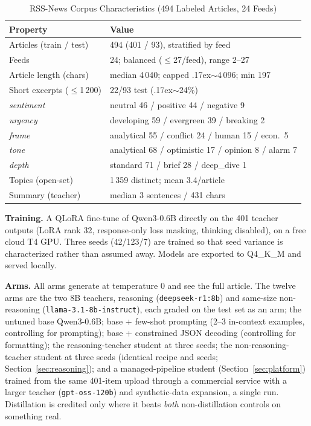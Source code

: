 \documentclass[10pt,journal]{IEEEtran}
\begin{document}
\begin{table}[t]
\centering
\caption{RSS-News Corpus Characteristics (494 Labeled Articles, 24 Feeds)}
\label{tab:corpus}
\small
\setlength{\tabcolsep}{3pt}\begin{tabular}{@{}l p{5.2cm}@{}}
\toprule
Property & Value \\
\midrule
Articles (train / test) & 494 (401 / 93), stratified by feed \\
Feeds & 24; balanced ($\leq$27/feed), range 2--27 \\
Article length (chars) & median 4\,040; capped {\raise.17ex\hbox{$\scriptstyle\sim$}}4\,096; min 197 \\
Short excerpts ($\leq$1\,200) & 22/93 test ({\raise.17ex\hbox{$\scriptstyle\sim$}}24\%) \\
\emph{sentiment} & neutral 46 / positive 44 / negative 9 \\
\emph{urgency} & developing 59 / evergreen 39 / breaking 2 \\
\emph{frame} & analytical 55 / conflict 24 / human 15 / econ.\ 5 \\
\emph{tone} & analytical 68 / optimistic 17 / opinion 8 / alarm 7 \\
\emph{depth} & standard 71 / brief 28 / deep\_dive 1 \\
Topics (open-set) & 1\,359 distinct; mean 3.4/article \\
Summary (teacher) & median 3 sentences / 431 chars \\
\bottomrule
\end{tabular}
\end{table}

\textbf{Training.} A QLoRA fine-tune of Qwen3-0.6B directly on the 401 teacher outputs (LoRA rank 32, response-only loss masking, thinking disabled), on a free cloud T4 GPU. Three seeds (42/123/7) are trained so that seed variance is characterized rather than assumed away. Models are exported to Q4\_K\_M and served locally.

\textbf{Arms.} All arms generate at temperature 0 and see the full article. The twelve arms are the two 8B teachers, reasoning (\texttt{deepseek-r1:8b}) and same-size non-reasoning (\texttt{llama-3.1-8b-instruct}), each graded on the test set as an arm; the untuned base Qwen3-0.6B; base + few-shot prompting (2--3 in-context examples, controlling for prompting); base + constrained JSON decoding (controlling for formatting); the reasoning-teacher student at three seeds; the non-reasoning-teacher student at three seeds (identical recipe and seeds; Section~\ref{sec:reasoning}); and a managed-pipeline student (Section~\ref{sec:platform}) trained from the same 401-item upload through a commercial service with a larger teacher (\texttt{gpt-oss-120b}) and synthetic-data expansion, a single run. Distillation is credited only where it beats \emph{both} non-distillation controls on something real.
\end{document}
